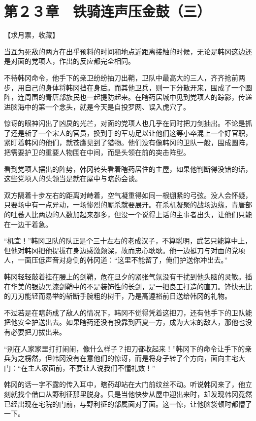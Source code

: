 \section{第２３章　铁骑连声压金鼓（三）}

【求月票，收藏】

当互为死敌的两方在出乎预料的时间和地点近距离接触的时候，无论是韩冈这边还是对面的党项人，作出的反应都完全相同。

不待韩冈命令，他手下的亲卫纷纷抽刀出鞘，卫队中最高大的三人，齐齐抢前两步，用自己的身体将韩冈挡在身后。而其他卫兵，则一下分散开来，围成了一个圆阵，连周围的青唐部族民也一起提防起来。在瞎药居城中见到党项人的踪影，传递进脑海中的第一个念头，就是今天是自投罗网、误入虎穴了。

惊讶的眼神闪出了凶戾的光芒，对面的党项人也几乎在同时把刀剑抽出。不论是抓了还是斩了一个宋人的官员，换到手的军功足以让他们这等小卒混上一个好官职，紧盯着韩冈的他们，就苍鹰见到了猎物。他们没有像韩冈的卫队一般，围成圆阵，把需要护卫的重要人物围在中间，而是头领在前的突击阵型。

看到党项人摆出的阵势，韩冈转头看着瞎药居住的主屋，如果他判断得没错的话，这些党项人的头领当是就在屋中与瞎药会谈。

双方隔着十步左右的距离对峙着，空气凝重得如同一根绷紧的弓弦。没人会怀疑，只要场中有一点异动，一场惨烈的厮杀就要展开。在杀机凝聚的战场边缘，青唐部的吐蕃人比两边的人数加起来都多，但没一个说得上话的主事者出头，让他们只能在一边干着急。

“机宜！”韩冈卫队的队正是个三十左右的老成汉子，不算聪明，武艺只能算中上，但他对韩冈把他提拔在身边感激颇深，故而忠心耿耿。他一边挺刀与对面的党项人，一面压低声音对身侧的韩冈道：“这里不能留了，俺们护送你冲出去。”

韩冈轻轻敲着挂在腰上的剑鞘，危在旦夕的紧张气氛没有干扰到他头脑的灵敏。插在华美的银边黑漆剑鞘中的不是装饰性的长剑，是一把良工打造的直刀。锋快无比的刀刃能轻而易举的斩断手腕粗的树干，乃是高遵裕前日送给韩冈的礼物。

不过若是在瞎药成了敌人的情况下，韩冈不觉得凭着这把刀，还有他手下的卫队能把他安全护送出去。如果瞎药还没有投靠到西夏一方，成为大宋的敌人，那他也没有必要把刀拔出来。

“别在人家家里打打闹闹，像什么样子？把刀都收起来！”韩冈下的命令让手下的亲兵为之楞然，但韩冈没有在意他们的惊讶，而是将身子转了个方向，面向主宅大门：“在主人家面前，不要让人说我们不懂礼数！”

韩冈的话一字不露的传入耳中，瞎药却站在大门前纹丝不动。听说韩冈来了，他立刻就找个借口从野利征那里脱身。只是当他快步从屋中迎出来时，却发现韩冈竟然已经出现在宅院的门前，与野利征的部属面对了面。这一惊，让他脑袋顿时都懵了一下。

